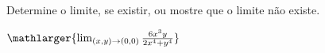 Determine o limite, se existir, ou mostre que o limite não existe.

$\mathlarger{\lim_{(x,y)\rightarrow(0,0)} \frac{6x^3y}{2x^4+y^4}}$
